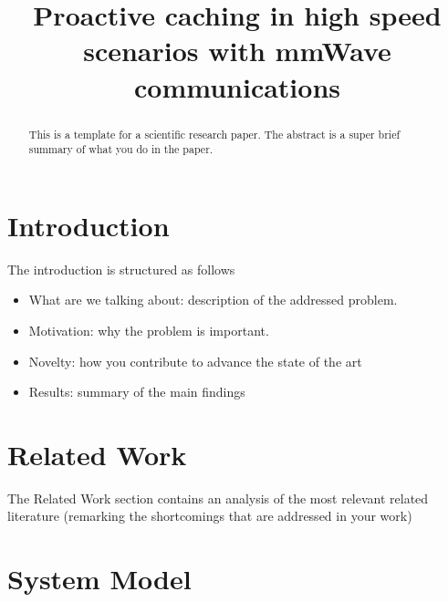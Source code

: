 \documentclass[conference,10pt]{IEEEtran}
\begin{document}
\title{Proactive	caching	in	high	speed	scenarios	with	mmWave	communications}

\author{
}

\maketitle


\begin{abstract}
This is a template for a scientific research paper. The abstract is a super brief summary of what you do in the paper.
\end{abstract}

\section{Introduction}\label{sec:intro}
The introduction is structured as follows
\begin{itemize}
	\item What are we talking about: description of the addressed problem. 
\item Motivation: why the problem is important.
\item Novelty: how you contribute to advance the state of the art
\item Results: summary of the main findings 
\end{itemize}

\section{Related Work}\label{sec:sota}
The Related Work section contains an analysis of the most relevant related literature (remarking the shortcomings that are addressed in your work)

\section{System Model}\label{sec:symo}
\end{document}

